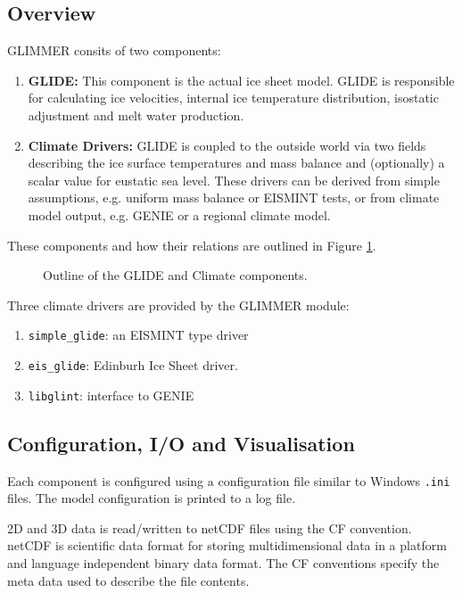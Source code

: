 \subsection{Overview}
GLIMMER consits of two components:
\begin{enumerate}
 \item {\bf GLIDE:} This component is the actual ice sheet model. GLIDE is responsible for calculating ice velocities, internal ice temperature distribution, isostatic adjustment and melt water production.
 \item {\bf Climate Drivers:} GLIDE is coupled to the outside world via two fields describing the ice surface temperatures and mass balance and (optionally) a scalar value for eustatic sea level. These drivers can be derived from simple assumptions, e.g. uniform mass balance or EISMINT tests, or from climate model output, e.g. GENIE or a regional climate model.
\end{enumerate}
These components and how their relations are outlined in Figure \ref{ug.glide}.

\begin{figure}[htb]
 \begin{center}
 \end{center}
 \caption{Outline of the GLIDE and Climate components.}
\label{ug.glide}
\end{figure}

Three climate drivers are provided by the GLIMMER module:
\begin{enumerate}
 \item \texttt{simple\_glide}: an EISMINT type driver
 \item \texttt{eis\_glide}: Edinburh Ice Sheet driver. 
 \item \texttt{libglint}: interface to GENIE
\end{enumerate}

\subsection{Configuration, I/O and Visualisation}
Each component is configured using a configuration file similar to Windows \texttt{.ini} files. The model configuration is printed to a log file. 

2D and 3D data is read/written to netCDF files using the CF convention. netCDF is scientific data format for storing multidimensional data in a platform and language independent binary data format. The CF conventions specify the meta data used to describe the file contents.

